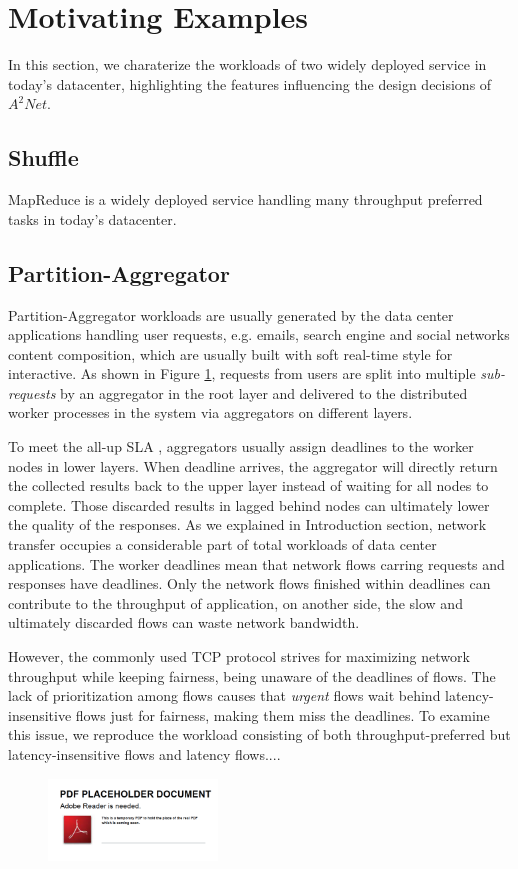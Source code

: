 \section{Motivating Examples}

In this section, we charaterize the workloads of two widely deployed service in today's datacenter, highlighting the features influencing the design decisions of $A^2Net$.

\subsection{Shuffle}

MapReduce is a widely deployed service handling many throughput preferred tasks in today's datacenter. 


\subsection{Partition-Aggregator}

Partition-Aggregator \cite{DCTCP} workloads are usually generated by the data center applications handling user requests, e.g. emails, search engine and social networks content composition, which are usually built with soft real-time style for interactive. As shown in Figure \ref{fig:par-agg}, requests from users are split into multiple \emph{sub-requests} by an aggregator in the root layer and delivered to the distributed worker processes in the system via aggregators on different layers. 

To meet the all-up SLA \cite{DCTCP}, aggregators usually assign deadlines to the worker nodes in lower layers. When deadline arrives, the aggregator will directly return the collected results back to the upper layer instead of waiting for all nodes to complete. Those discarded results in lagged behind nodes can ultimately lower the quality of the responses. As we explained in Introduction section, network transfer occupies a considerable part of total workloads of data center applications. The worker deadlines mean that network flows carring requests and responses have deadlines. Only the network flows finished within deadlines can contribute to the throughput of application, on another side, the slow and ultimately discarded flows can waste network bandwidth.

However, the commonly used TCP protocol strives for maximizing network throughput while keeping fairness, being unaware of the deadlines of flows. The lack of prioritization among flows causes that \emph{urgent} flows wait behind latency-insensitive flows just for fairness, making them miss the deadlines. To examine this issue, we reproduce the workload consisting of both throughput-preferred but latency-insensitive flows and latency flows....


\begin{figure}
  \centering
  \includegraphics[width=0.4\textwidth]{pic/placeholder}\\
  \caption{}
  \label{fig:par-agg}
\end{figure}

